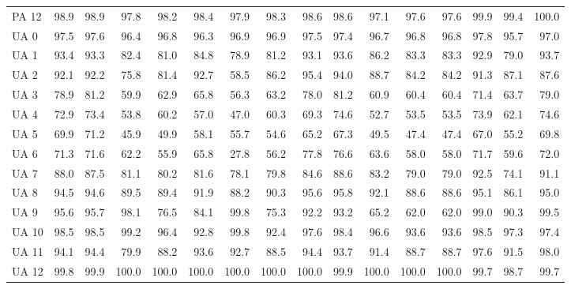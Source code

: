 \documentclass[a4paper,10pt,DIV=16]{scrartcl}
\begin{document}
\begin{table}[h]
\begin{tabular}{lrrrrrrrrrrrrrrr}
    PA 12 & 98.9 & 98.9 & 97.8 & 98.2 & 98.4 & 97.9 & 98.3 & 98.6 & 98.6 & 97.1 & 97.6 & 97.6 & 99.9 & 99.4 & 100.0 \\
    UA 0 & 97.5 & 97.6 & 96.4 & 96.8 & 96.3 & 96.9 & 96.9 & 97.5 & 97.4 & 96.7 & 96.8 & 96.8 & 97.8 & 95.7 & 97.0 \\
    UA 1 & 93.4 & 93.3 & 82.4 & 81.0 & 84.8 & 78.9 & 81.2 & 93.1 & 93.6 & 86.2 & 83.3 & 83.3 & 92.9 & 79.0 & 93.7 \\
    UA 2 & 92.1 & 92.2 & 75.8 & 81.4 & 92.7 & 58.5 & 86.2 & 95.4 & 94.0 & 88.7 & 84.2 & 84.2 & 91.3 & 87.1 & 87.6 \\
    UA 3 & 78.9 & 81.2 & 59.9 & 62.9 & 65.8 & 56.3 & 63.2 & 78.0 & 81.2 & 60.9 & 60.4 & 60.4 & 71.4 & 63.7 & 79.0 \\
    UA 4 & 72.9 & 73.4 & 53.8 & 60.2 & 57.0 & 47.0 & 60.3 & 69.3 & 74.6 & 52.7 & 53.5 & 53.5 & 73.9 & 62.1 & 74.6 \\
    UA 5 & 69.9 & 71.2 & 45.9 & 49.9 & 58.1 & 55.7 & 54.6 & 65.2 & 67.3 & 49.5 & 47.4 & 47.4 & 67.0 & 55.2 & 69.8 \\
    UA 6 & 71.3 & 71.6 & 62.2 & 55.9 & 65.8 & 27.8 & 56.2 & 77.8 & 76.6 & 63.6 & 58.0 & 58.0 & 71.7 & 59.6 & 72.0 \\
    UA 7 & 88.0 & 87.5 & 81.1 & 80.2 & 81.6 & 78.1 & 79.8 & 84.6 & 88.6 & 83.2 & 79.0 & 79.0 & 92.5 & 74.1 & 91.1 \\
    UA 8 & 94.5 & 94.6 & 89.5 & 89.4 & 91.9 & 88.2 & 90.3 & 95.6 & 95.8 & 92.1 & 88.6 & 88.6 & 95.1 & 86.1 & 95.0 \\
    UA 9 & 95.6 & 95.7 & 98.1 & 76.5 & 84.1 & 99.8 & 75.3 & 92.2 & 93.2 & 65.2 & 62.0 & 62.0 & 99.0 & 90.3 & 99.5 \\
    UA 10 & 98.5 & 98.5 & 99.2 & 96.4 & 92.8 & 99.8 & 92.4 & 97.6 & 98.4 & 96.6 & 93.6 & 93.6 & 98.5 & 97.3 & 97.4 \\
    UA 11 & 94.1 & 94.4 & 79.9 & 88.2 & 93.6 & 92.7 & 88.5 & 94.4 & 93.7 & 91.4 & 88.7 & 88.7 & 97.6 & 91.5 & 98.0 \\
    UA 12 & 99.8 & 99.9 & 100.0 & 100.0 & 100.0 & 100.0 & 100.0 & 100.0 & 99.9 & 100.0 & 100.0 & 100.0 & 99.7 & 98.7 & 99.7 \\
  \end{tabular}
\end{table}
\end{document}
